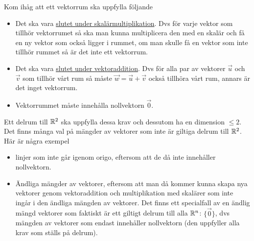 \documentclass[../../main.tex]{subfiles}
\begin{document}
\begin{solution}{5}

Kom ihåg att ett vektorrum ska uppfylla följande
\begin{itemize}
    \item Det ska vara \underline{slutet under skalärmultiplikation}. Dvs för varje vektor som tillhör vektorrumet så ska man kunna multiplicera den med en skalär och få en ny vektor som också ligger i rummet, om man skulle få en vektor som inte tillhör rummet så är det inte ett vektorrum.
    \item Det ska vara \underline{slutet under vektoraddition}. Dvs för alla par av vektorer $\Vec{u}$ och $\Vec{v}$ som tillhör vårt rum så måste $\Vec{w} = \Vec{u} + \Vec{v}$ också tillhöra vårt rum, annars är det inget vektorrum.
    \item Vektorrummet måste innehålla nollvektorn $\vec{0}$.
\end{itemize}

Ett delrum till $\mathbb{R}^{2}$ ska uppfylla dessa krav och dessutom ha en dimension $\leq 2$. Det finns många val på mängder av vektorer som inte är giltiga delrum till $\mathbb{R}^{2}$. Här är några exempel

\begin{itemize}
    \item linjer som inte går igenom origo, eftersom att de då inte innehåller nollvektorn.
    \item Ändliga mängder av vektorer, eftersom att man då kommer kunna skapa nya vektorer genom vektoraddition och multiplikation med skalärer som inte ingår i den ändliga mängden av vektorer. Det finns ett specialfall av en ändlig mängd vektorer som faktiskt är ett giltigt delrum till alla $\mathbb{R}^{n}$: $\{\vec{0}\}$, dvs mängden av vektorer som endast innehåller nollvektorn (den uppfyller alla krav som ställs på delrum).
\end{itemize}

\end{solution}
\end{document}
